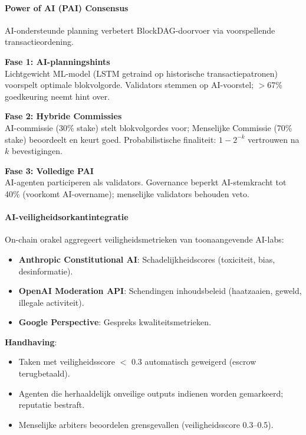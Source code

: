 \documentclass[11pt]{article}
\begin{document}
\paragraph{Power of AI (PAI) Consensus}
AI-ondersteunde planning verbetert BlockDAG-doorvoer via voorspellende transactieordening.

\textbf{Fase 1: AI-planningshints}\\
Lichtgewicht ML-model (LSTM getraind op historische transactiepatronen) voorspelt optimale blokvolgorde. Validators stemmen op AI-voorstel; $>$67\% goedkeuring neemt hint over.

\textbf{Fase 2: Hybride Commissies}\\
AI-commissie (30\% stake) stelt blokvolgordes voor; Menselijke Commissie (70\% stake) beoordeelt en keurt goed. Probabilistische finaliteit: $1 - 2^{-k}$ vertrouwen na $k$ bevestigingen.

\textbf{Fase 3: Volledige PAI}\\
AI-agenten participeren als validators. Governance beperkt AI-stemkracht tot 40\% (voorkomt AI-overname); menselijke validators behouden veto.

\paragraph{AI-veiligheidsorkantintegratie}
On-chain orakel aggregeert veiligheidsmetrieken van toonaangevende AI-labs:
\begin{itemize}[noitemsep]
  \item \textbf{Anthropic Constitutional AI}: Schadelijkheidscores (toxiciteit, bias, desinformatie).
  \item \textbf{OpenAI Moderation API}: Schendingen inhoudsbeleid (haatzaaien, geweld, illegale activiteit).
  \item \textbf{Google Perspective}: Gespreks kwaliteitsmetrieken.
\end{itemize}

\textbf{Handhaving}:
\begin{itemize}[noitemsep]
  \item Taken met veiligheidsscore $<$ 0.3 automatisch geweigerd (escrow terugbetaald).
  \item Agenten die herhaaldelijk onveilige outputs indienen worden gemarkeerd; reputatie bestraft.
  \item Menselijke arbiters beoordelen grensgevallen (veiligheidsscore 0.3--0.5).
\end{itemize}
\end{document}
